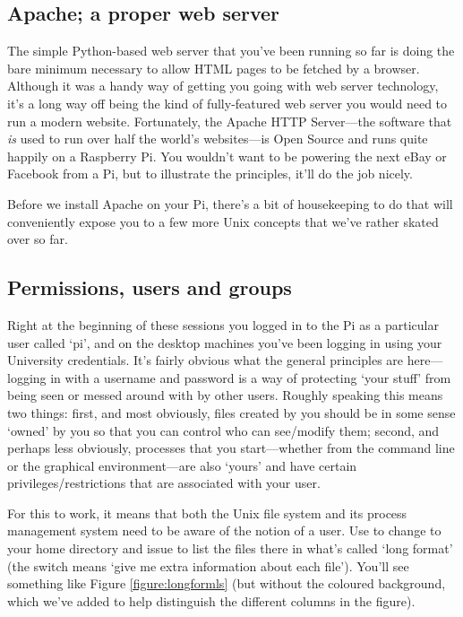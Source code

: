 \subsection{Apache; a proper web server}

The simple Python-based web server that you've been running so far is doing the bare minimum necessary to allow HTML pages to be fetched by a browser. Although it was a handy way of getting you going with web server technology, it's a long way off being the kind of fully-featured web server you would need to run a modern website. Fortunately, the Apache HTTP Server---the software that \textit{is} used to run over half the world's websites---is Open Source and runs quite happily on a Raspberry Pi. You wouldn't want to be powering the next eBay or Facebook from a Pi, but to illustrate the principles, it'll do the job nicely. 

Before we install Apache on your Pi, there's a bit of housekeeping to do that will conveniently expose you to a few more Unix concepts that we've rather skated over so far. 

\subsection{Permissions, users and groups}

Right at the beginning of these sessions you logged in to the Pi as a particular user called `pi', and on the desktop machines you've been logging in using your University credentials. It's fairly obvious what the general principles are here---logging in with a username and password is a way of protecting `your stuff' from being seen or messed around with by other users. Roughly speaking this means two things: first, and most obviously, files created by you should be in some sense `owned' by you so that you can control who can see/modify them; second, and perhaps less obviously, processes that you start---whether from the command line or the graphical environment---are also `yours' and have certain privileges/restrictions that are associated with your user. 

For this to work, it means that both the Unix file system and its process management system need to be aware of the notion of a user. Use  to change to your home directory and issue  to list the files there in what's called `long format' (the  switch means `give me extra information about each file'). You'll see something like Figure \ref{figure:longformls} (but without the coloured background, which we've added to help distinguish the different columns in the figure).

